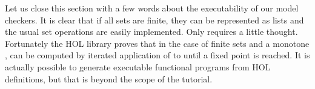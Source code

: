 \begin{isabellebody}
\begin{isamarkuptext}
Let us close this section with a few words about the executability of our model checkers.
It is clear that if all sets are finite, they can be represented as lists and the usual
set operations are easily implemented. Only  requires a little thought.
Fortunately the HOL library proves that in the case of finite sets and a monotone ,
 can be computed by iterated application of  to \isa{{\isacharbraceleft}{\isacharbraceright}} until
a fixed point is reached. It is actually possible to generate executable functional programs
from HOL definitions, but that is beyond the scope of the tutorial.%
\end{isamarkuptext}%
\end{isabellebody}%
